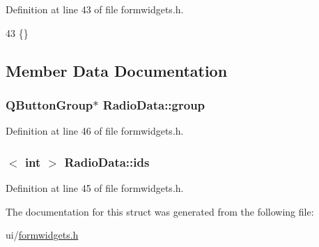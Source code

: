 Definition at line 43 of file formwidgets.\+h.


\begin{DoxyCode}
43 \{\}
\end{DoxyCode}


\subsection{Member Data Documentation}
\hypertarget{structRadioData_a1c709c31b16adf9860dcec8c45768218}{
\subsubsection[{group}]{\setlength{\rightskip}{0pt plus 5cm}Q\+Button\+Group$\ast$ Radio\+Data\+::group}}\label{structRadioData_a1c709c31b16adf9860dcec8c45768218}


Definition at line 46 of file formwidgets.\+h.

\hypertarget{structRadioData_a21f69679e22a608dcd636c0daddd7326}{
\subsubsection[{ids}]{$<$ int $>$ Radio\+Data\+::ids}}\label{structRadioData_a21f69679e22a608dcd636c0daddd7326}


Definition at line 45 of file formwidgets.\+h.



The documentation for this struct was generated from the following file\+:\begin{DoxyCompactItemize}
\item 
ui/\hyperlink{formwidgets_8h}{formwidgets.\+h}\end{DoxyCompactItemize}
